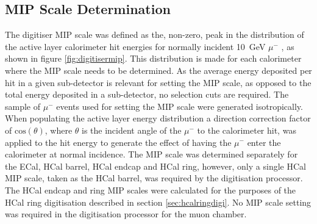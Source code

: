 
\subsection{MIP Scale Determination}
\label{sec:mipresponse}
The digitiser MIP scale was defined as the, non-zero, peak in the distribution of the active layer calorimeter hit energies for normally incident 10~GeV $\mu^{-}$ \cite{Bichsel:2004ej}, as shown in figure \ref{fig:digitisermip}.  This distribution is made for each calorimeter where the MIP scale needs to be determined.  As the average energy deposited per hit in a given sub-detector is relevant for setting the MIP scale, as opposed to the total energy deposited in a sub-detector, no selection cuts are required.  The sample of $\mu^{-}$ events used for setting the MIP scale were generated isotropically.  When populating the active layer energy distribution a direction correction factor of $\text{cos}(\theta)$, where $\theta$ is the incident angle of the $\mu^{-}$ to the calorimeter hit, was applied to the hit energy to generate the effect of having the $\mu^{-}$ enter the calorimeter at normal incidence.  The MIP scale was determined separately for the ECal, HCal barrel, HCal endcap and HCal ring, however, only a single HCal MIP scale, taken as the HCal barrel, was required by the digitisation processor.  The HCal endcap and ring MIP scales were calculated for the purposes of the HCal ring digitisation described in section \ref{sec:hcalringdigi}.  No MIP scale setting was required in the digitisation processor for the muon chamber.  

